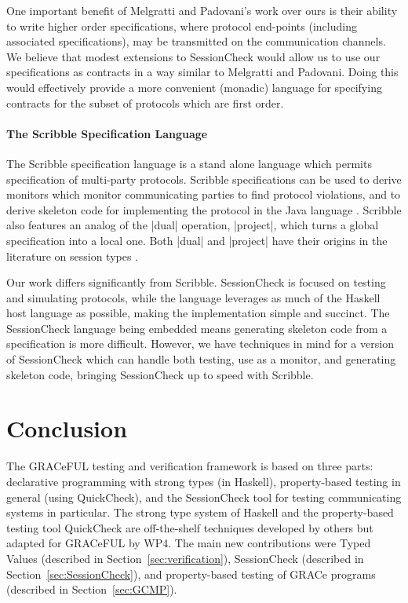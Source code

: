 \documentclass{article}
\begin{document}
One important benefit of Melgratti and Padovani's work over ours is
their ability to write higher order specifications, where protocol
end-points (including associated specifications), may be transmitted
on the communication channels.
%
We believe that modest extensions to SessionCheck would allow us to
use our specifications as contracts in a way similar to Melgratti and
Padovani.
%
Doing this would effectively provide a more convenient (monadic)
language for specifying contracts for the subset of protocols which
are first order.
%

\paragraph{The Scribble Specification Language}
%
The Scribble specification language \cite{Scribble} is a stand alone language
which permits specification of multi-party protocols.
%
Scribble specifications can be used to derive monitors which monitor communicating
parties to find protocol violations, and to derive skeleton code for implementing
the protocol in the Java language \cite{Java}.
%
Scribble also features an analog of the |dual| operation, |project|, which turns a
global specification into a local one.
%
Both |dual| and |project| have their origins in the literature on session types
\cite{HondaSessionTypes, WadlerSessionTypes}.

Our work differs significantly from Scribble.
%
SessionCheck is focused on testing and simulating protocols, while the language
leverages as much of the Haskell host language as possible, making the implementation
simple and succinct.
%
The SessionCheck language being embedded means generating skeleton code from a
specification is more difficult.
%
However, we have techniques in mind for a version of SessionCheck which can handle
both testing, use as a monitor, and generating skeleton code, bringing SessionCheck
up to speed with Scribble.
%

\section{Conclusion}

The GRACeFUL testing and verification framework is based on three
parts: declarative programming with strong types (in Haskell),
property-based testing in general (using QuickCheck), and the
SessionCheck tool for testing communicating systems in particular.
%
The strong type system of Haskell and the property-based testing tool
QuickCheck are off-the-shelf techniques developed by others but
adapted for GRACeFUL by WP4.
%
The main new contributions were Typed Values (described in
Section~\ref{sec:verification}), SessionCheck (described in
Section~\ref{sec:SessionCheck}), and property-based testing of GRACe programs
(described in Section~\ref{sec:GCMP}).
%




\end{document}
